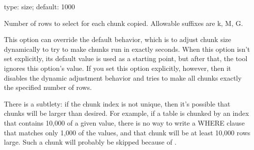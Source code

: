 \documentclass[letterpaper,10pt,english]{sphinxmanual}
\begin{document}
\begin{fulllineitems}
\label{\detokenize{mariadb-schema-change:cmdoption-mariadb-schema-change-chunk-size}}
type: size; default: 1000

Number of rows to select for each chunk copied.  Allowable suffixes are
k, M, G.

This option can override the default behavior, which is to adjust chunk size
dynamically to try to make chunks run in exactly {\hyperref[\detokenize{mariadb-schema-change:cmdoption-mariadb-schema-change-chunk-time}]{}} seconds.
When this option isn’t set explicitly, its default value is used as a starting
point, but after that, the tool ignores this option’s value.  If you set this
option explicitly, however, then it disables the dynamic adjustment behavior and
tries to make all chunks exactly the specified number of rows.

There is a subtlety: if the chunk index is not unique, then it’s possible that
chunks will be larger than desired. For example, if a table is chunked by an
index that contains 10,000 of a given value, there is no way to write a WHERE
clause that matches only 1,000 of the values, and that chunk will be at least
10,000 rows large.  Such a chunk will probably be skipped because of
{\hyperref[\detokenize{mariadb-schema-change:cmdoption-mariadb-schema-change-chunk-size-limit}]{}}.

\end{fulllineitems}

\end{document}
